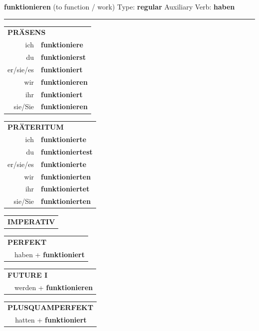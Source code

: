 \documentclass[10pt,a4paper]{revtex4-2}
\begin{document}
\begin{verbbox}
{\Large \bf funktionieren} (to function / work) \hfill Type: \textbf{regular} \hfill Auxiliary Verb: \textbf{haben}

\vspace{5pt}
\hrule
\vspace{5pt}

\begin{tabular}{rl}
\multicolumn{2}{l}{\textbf{PRÄSENS}}\\
ich & \textbf{funktioniere}\\
du & \textbf{funktionierst}\\
er/sie/es & \textbf{funktioniert}\\
wir & \textbf{funktionieren}\\
ihr & \textbf{funktioniert}\\
sie/Sie & \textbf{funktionieren}\\
\end{tabular}
\hfill
\begin{tabular}{rl}
\multicolumn{2}{l}{\textbf{PRÄTERITUM}}\\
ich & \textbf{funktionierte}\\
du & \textbf{funktioniertest}\\
er/sie/es & \textbf{funktionierte}\\
wir & \textbf{funktionierten}\\
ihr & \textbf{funktioniertet}\\
sie/Sie & \textbf{funktionierten}\\
\end{tabular}
\hfill
\begin{tabular}{rl}
\multicolumn{2}{l}{\textbf{IMPERATIV}}\\
\end{tabular}

\vspace{10pt}

\begin{tabular}{rl}
\multicolumn{2}{l}{\textbf{PERFEKT}}\\
& haben + \textbf{funktioniert}\\
\end{tabular}
\hfill
\begin{tabular}{rl}
\multicolumn{2}{l}{\textbf{FUTURE I}}\\
& werden + \textbf{funktionieren}\\
\end{tabular}
\hfill
\begin{tabular}{rl}
\multicolumn{2}{l}{\textbf{PLUSQUAMPERFEKT}}\\
& hatten + \textbf{funktioniert}\\
\end{tabular}


\end{verbbox}
\end{document}
